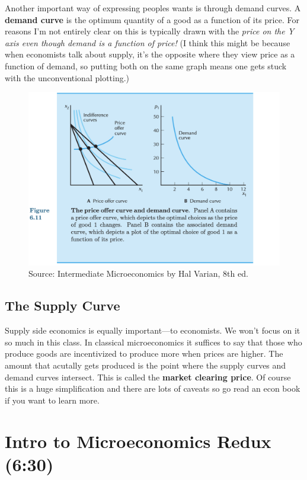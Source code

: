 \documentclass[11pt]{article}
\begin{document}
Another important way of expressing peoples wants is through demand curves. 
A {\bf demand curve} is the optimum quantity of a good as a function of its price. 
For reasons I'm not entirely clear on this is typically drawn with the {\it price on the Y axis even though demand is a function of price!}
(I think this might be because when economists talk about supply, it's the opposite where they view price as a function of demand, so putting both on the same graph means one gets stuck with the unconventional plotting.)



\begin{figure}[h]
    \centering
    \includegraphics*[width=4.5in]{demandcurve.png}
    \caption{Source: Intermediate Microeconomics by Hal Varian, 8th ed.}
    \label{fig:demand}
\end{figure}

\subsection{The Supply Curve}

Supply side economics is equally important---to economists. We won't focus on it so much in this class. In classical microeconomics it suffices to say that those who produce goods are incentivized to produce more when prices are higher. The amount that acutally gets produced is the point where the supply curves and demand curves intersect. This is called the {\bf market clearing price}. Of course this is a huge simplification and there are lots of caveats so go read an econ book if you want to learn more. 



\section{Intro to Microeconomics Redux (6:30)}
\end{document}
